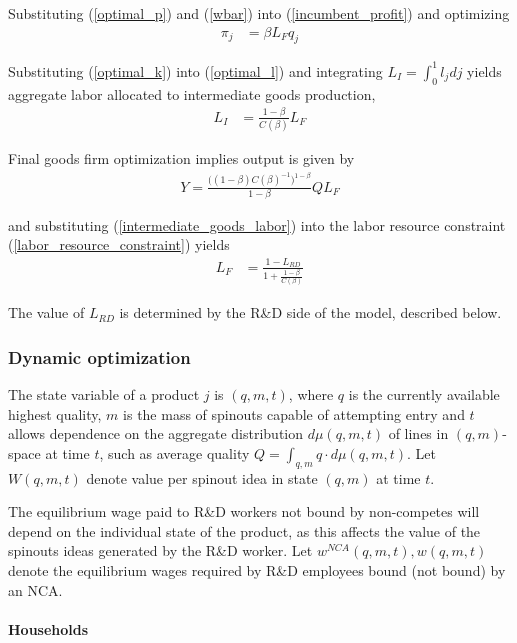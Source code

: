 \documentclass[12pt,english]{article}
\theoremstyle{remark}
\begin{document}
Substituting (\ref{optimal_p}) and (\ref{wbar}) into (\ref{incumbent_profit}) and optimizing
\begin{align}
\pi_j &= \beta L_F q_j \label{profits_eq}
\end{align}

Substituting (\ref{optimal_k}) into (\ref{optimal_l}) and integrating $L_I = \int_0^1 l_j dj$ yields aggregate labor allocated to intermediate goods production,
\begin{align}
	L_I &= \frac{1-\beta}{C(\beta)}L_F \label{intermediate_goods_labor}
\end{align}

Final goods firm optimization implies output is given by 
\begin{align}
	Y = \frac{\Big((1-\beta)C(\beta)^{-1}\Big)^{1-\beta}}{1-\beta} Q L_F
\end{align}

and substituting (\ref{intermediate_goods_labor}) into the labor resource constraint (\ref{labor_resource_constraint}) yields
\begin{align}
	L_F &= \frac{1 - L_{RD}}{1 + \frac{1-\beta}{C(\beta)}}
\end{align}

The value of $L_{RD}$ is determined by the R\&D side of the model, described below.

\subsubsection{Dynamic optimization}

The state variable of a product $j$ is $(q,m,t)$, where $q$ is the currently available highest quality, $m$ is the mass of spinouts capable of attempting entry and $t$ allows dependence on the aggregate distribution $d\mu(q,m,t)$ of lines in $(q,m)$-space at time $t$, such as average quality $Q = \int_{q,m} q  \cdot d\mu(q,m,t)$. Let $W(q,m,t)$ denote value per spinout idea in state $(q,m)$ at time $t$. 

The equilibrium wage paid to R\&D workers not bound by non-competes will depend on the individual state of the product, as this affects the value of the spinouts ideas generated by the R\&D worker. Let $w^{NCA}(q,m,t),w(q,m,t)$ denote the equilibrium wages required by R\&D employees bound (not bound) by an NCA.

\paragraph{Households}
\end{document}
